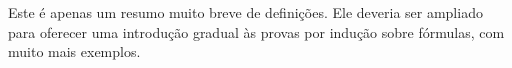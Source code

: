 \documentclass[../../../include/open-logic-chapter]{subfiles}
\begin{document}

\begin{editorial}
  Este é apenas um resumo muito breve de definições. Ele deveria ser
  ampliado para oferecer uma introdução gradual às provas por indução sobre
  fórmulas, com muito mais exemplos.
\end{editorial}







\OLEndChapterHook
\end{document}
